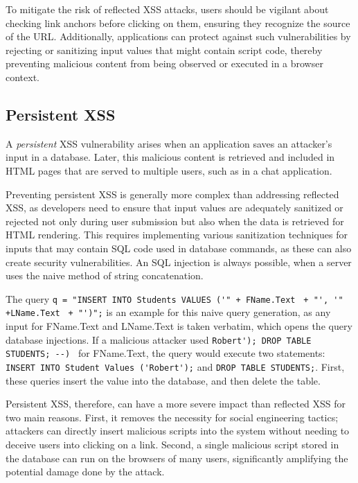 To mitigate the risk of reflected XSS attacks, users should be vigilant about checking link anchors before clicking on them, ensuring they recognize the source of the URL. Additionally, applications can protect against such vulnerabilities by rejecting or sanitizing input values that might contain script code, thereby preventing malicious content from being observed or executed in a browser context.

\subsection{Persistent XSS}
A \textit{persistent} XSS vulnerability arises when an application saves an attacker's input in a database. Later, this malicious content is retrieved and included in HTML pages that are served to multiple users, such as in a chat application.

Preventing persistent XSS is generally more complex than addressing reflected XSS, as developers need to ensure that input values are adequately sanitized or rejected not only during user submission but also when the data is retrieved for HTML rendering. This requires implementing various sanitization techniques for inputs that may contain SQL code used in database commands, as these can also create security vulnerabilities. An SQL injection is always possible, when a server uses the naive method of string concatenation.

The query \lstinline{q = "INSERT INTO Students VALUES ('" + FName.Text } 
\lstinline{+ "', '" +LName.Text} \lstinline{ + "')";} is an example for this naive query generation, as any input for FName.Text and LName.Text is taken verbatim, which opens the query database injections. If a malicious attacker used \lstinline{Robert'); DROP TABLE STUDENTS; --) } for FName.Text, the query would execute two statements: \lstinline{INSERT INTO Student Values ('Robert');} and \lstinline{DROP TABLE STUDENTS;}. First, these queries insert the value into the database, and then delete the table. 

Persistent XSS, therefore, can have a more severe impact than reflected XSS for two main reasons. First, it removes the necessity for social engineering tactics; attackers can directly insert malicious scripts into the system without needing to deceive users into clicking on a link. Second, a single malicious script stored in the database can run on the browsers of many users, significantly amplifying the potential damage done by the attack.


